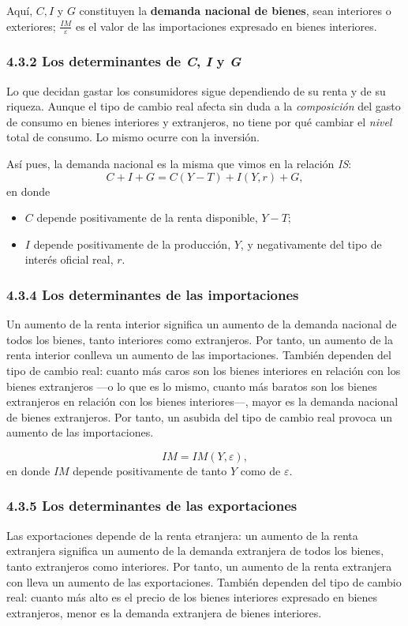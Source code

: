\documentclass[10pt]{article}
\begin{document}
\begin{multicols*}{2}
Aquí, $C, I$ y $G$ constituyen la \textbf{demanda nacional de bienes}, sean interiores o exteriores; $\frac{IM}{\varepsilon}$ es el valor de las importaciones expresado en bienes interiores.

\subsubsection{4.3.2 Los determinantes de \textit{C}, \textit{I} y \textit{G}}
Lo que decidan gastar los consumidores sigue dependiendo de su renta y de su riqueza. Aunque el tipo de cambio real afecta sin duda a la \textit{composición} del gasto de consumo en bienes interiores y extranjeros, no tiene por qué cambiar el \textit{nivel} total de consumo. Lo mismo ocurre con la inversión. 

Así pues, la demanda nacional es la misma que vimos en la relación \textit{IS}:
\[ C+I+G = C(Y-T) + I(Y,r) + G, \]
en donde
\begin{itemize}
    \item $C$ depende positivamente de la renta disponible, $Y-T$;
    \item $I$ depende positivamente de la producción, $Y$, y negativamente del tipo de interés oficial real, $r$.
\end{itemize}

\subsubsection{4.3.4 Los determinantes de las importaciones}
Un aumento de la renta interior significa un aumento de la demanda nacional de todos los bienes, tanto interiores como extranjeros. Por tanto, un aumento de la renta interior conlleva un aumento de las importaciones. También dependen del tipo de cambio real: cuanto más caros son los bienes interiores en relación con los bienes extranjeros —o lo que es lo mismo, cuanto más baratos son los bienes extranjeros en relación con los bienes interiores—, mayor es la demanda nacional de bienes extranjeros. Por tanto, un asubida del tipo de cambio real provoca un aumento de las importaciones.

\[ IM = IM(Y, \varepsilon),\]
en donde $IM$ depende positivamente de tanto $Y$ como de $\varepsilon$.

\subsubsection{4.3.5 Los determinantes de las exportaciones}
Las exportaciones depende de la renta etranjera: un aumento de la renta extranjera significa un aumento de la demanda extranjera de todos los bienes, tanto extranjeros como interiores. Por tanto, un aumento de la renta extranjera con lleva un aumento de las exportaciones. También dependen del tipo de cambio real: cuanto más alto es el precio de los bienes interiores expresado en bienes extranjeros, menor es la demanda extranjera de bienes interiores.


\end{multicols*}
\end{document}
